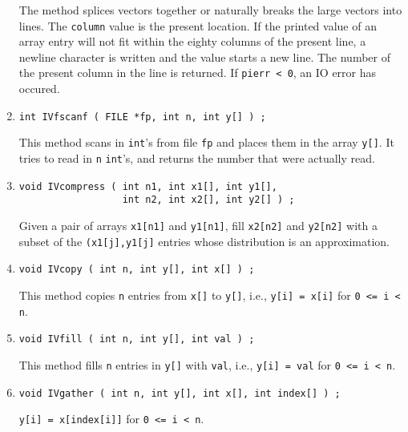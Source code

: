 \begin{enumerate}
The method splices vectors together or naturally breaks the large
vectors into lines. 
The {\tt column} value is the present location. 
If the printed value of an array entry will not fit within the eighty
columns of the present line, a newline character is written and the
value starts a new line.
The number of the present column in the line is returned.
If {\tt *pierr < 0}, an IO error has occured.
\item
\begin{verbatim}
int IVfscanf ( FILE *fp, int n, int y[] ) ;
\end{verbatim}
This method scans in {\tt int}'s from file {\tt fp} and places them
in the array {\tt y[]}.
It tries to read in {\tt n} {\tt int}'s, and returns the number
that were actually read.
\item
\begin{verbatim}
void IVcompress ( int n1, int x1[], int y1[],
                  int n2, int x2[], int y2[] ) ;
\end{verbatim}
Given a pair of arrays {\tt x1[n1]} and {\tt y1[n1]},
fill {\tt x2[n2]} and {\tt y2[n2]} with a subset of the
{\tt (x1[j],y1[j]} entries whose distribution is an approximation.
\item
\begin{verbatim}
void IVcopy ( int n, int y[], int x[] ) ;
\end{verbatim}
This method copies {\tt n} entries from {\tt x[]} to {\tt y[]},
i.e.,
{\tt y[i] = x[i]} for {\tt 0 <= i < n}.
\item
\begin{verbatim}
void IVfill ( int n, int y[], int val ) ;
\end{verbatim}
This method fills {\tt n} entries in {\tt y[]} with {\tt val}, 
i.e.,
{\tt y[i] = val} for {\tt 0 <= i < n}.
\item
\begin{verbatim}
void IVgather ( int n, int y[], int x[], int index[] ) ;
\end{verbatim}
{\tt y[i] = x[index[i]]} for {\tt 0 <= i < n}.

\end{enumerate}
